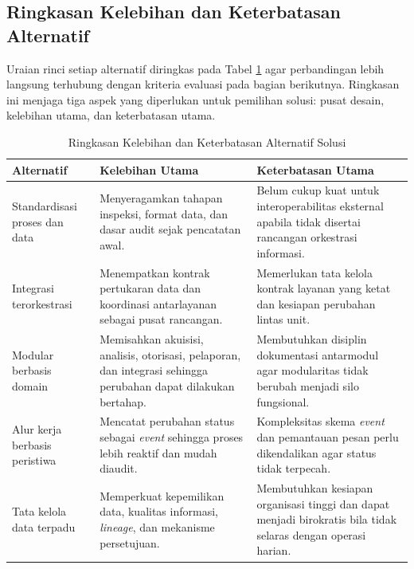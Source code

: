 \FloatBarrier

\subsection{Ringkasan Kelebihan dan Keterbatasan Alternatif}

Uraian rinci setiap alternatif diringkas pada Tabel
\ref{tbl:ringkasan-alternatif-solusi} agar perbandingan lebih langsung
terhubung dengan kriteria evaluasi pada bagian berikutnya. Ringkasan ini
menjaga tiga aspek yang diperlukan untuk pemilihan solusi: pusat desain,
kelebihan utama, dan keterbatasan utama.

\begin{table}[htbp]
\centering
\scriptsize
\caption{Ringkasan Kelebihan dan Keterbatasan Alternatif Solusi}
\label{tbl:ringkasan-alternatif-solusi}
\setlength{\tabcolsep}{3pt}
\renewcommand{\arraystretch}{1.10}
\begin{tabularx}{\textwidth}{>{\raggedright\arraybackslash}p{} >{\raggedright\arraybackslash}X >{\raggedright\arraybackslash}X}
\toprule
\textbf{Alternatif} & \textbf{Kelebihan Utama} & \textbf{Keterbatasan Utama} \\
\midrule
Standardisasi proses dan data & Menyeragamkan tahapan inspeksi, format data, dan dasar audit sejak pencatatan awal. & Belum cukup kuat untuk interoperabilitas eksternal apabila tidak disertai rancangan orkestrasi informasi. \\
Integrasi terorkestrasi & Menempatkan kontrak pertukaran data dan koordinasi antarlayanan sebagai pusat rancangan. & Memerlukan tata kelola kontrak layanan yang ketat dan kesiapan perubahan lintas unit. \\
Modular berbasis domain & Memisahkan akuisisi, analisis, otorisasi, pelaporan, dan integrasi sehingga perubahan dapat dilakukan bertahap. & Membutuhkan disiplin dokumentasi antarmodul agar modularitas tidak berubah menjadi silo fungsional. \\
Alur kerja berbasis peristiwa & Mencatat perubahan status sebagai \textit{event} sehingga proses lebih reaktif dan mudah diaudit. & Kompleksitas skema \textit{event} dan pemantauan pesan perlu dikendalikan agar status tidak terpecah. \\
Tata kelola data terpadu & Memperkuat kepemilikan data, kualitas informasi, \textit{lineage}, dan mekanisme persetujuan. & Membutuhkan kesiapan organisasi tinggi dan dapat menjadi birokratis bila tidak selaras dengan operasi harian. \\
\bottomrule
\end{tabularx}
\end{table}

